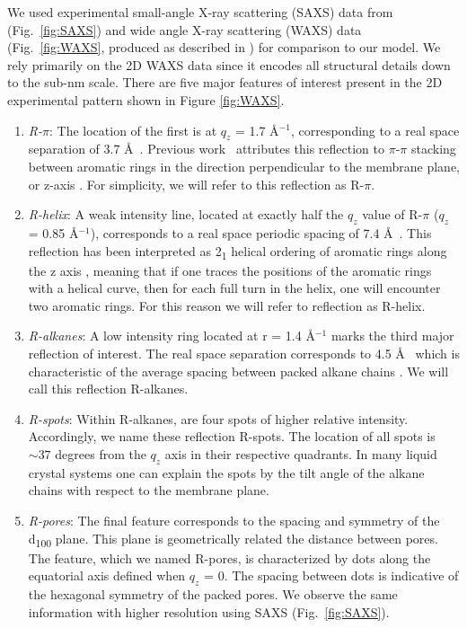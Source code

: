 \documentclass[journal=jpcbfk,manusciprt=article]{achemso}
\begin{document}
  We used experimental small-angle X-ray scattering (SAXS) data from
  \cite{feng_thin_2016} (Fig.~\ref{fig:SAXS}) and wide angle X-ray scattering
  (WAXS) data (Fig.~\ref{fig:WAXS}, produced as described in
  \cite{feng_scalable_2014}) for comparison to our model. We rely primarily on the 2D WAXS data
  since it encodes all structural details down to the sub-nm scale.  There are
  five major features of interest present in the 2D experimental pattern shown in
  Figure \ref{fig:WAXS}.

  \begin{enumerate} 
  
	\item \textit{R-$\pi$}: The location of the first is at $q_z$ = 1.7
	\AA$^{-1}$, corresponding to a real space separation of 3.7 \AA~. Previous
	work~\cite{feng_scalable_2014} attributes this reflection to $\pi$-$\pi$
	stacking between aromatic rings in the direction perpendicular to the membrane
	plane, or z-axis \cite{feng_scalable_2014}. For simplicity, we will refer to
	this reflection as R-$\pi$.
 
	\item \textit{R-helix}: A weak intensity line, located at exactly half
	the $q_z$ value of R-$\pi$ ($q_z$ = 0.85 \AA$^{-1}$), corresponds to a real
	space periodic spacing of 7.4 \AA~. This reflection has been interpreted as
	2\textsubscript{1} helical ordering of aromatic rings along the z axis
	\cite{feng_scalable_2014}, meaning that if one traces the positions of the
	aromatic rings with a helical curve, then for each full turn in the helix, one
	will encounter two aromatic rings. For this reason we will refer to reflection
	as R-helix. 

	\item \textit{R-alkanes}: A low intensity ring located at r = 1.4
	\AA$^{-1}$ marks the third major reflection of interest. The real space
	separation corresponds to 4.5 \AA~ which is characteristic of the average
	spacing between packed alkane chains \cite{mcintosh_organization_1980}. We will
	call this reflection R-alkanes.

	\item \textit{R-spots}: Within R-alkanes, are four spots of higher
	relative intensity.  Accordingly, we name these reflection R-spots. The
	location of all spots is $\sim 37$ degrees from the $q_z$ axis in their
	respective quadrants. In many liquid crystal systems one can explain the spots
	by the tilt angle of the alkane chains with respect to the membrane 
	plane\cite{govind_simple_2001}.
 
	\item \textit{R-pores}: The final feature corresponds to the spacing
	and symmetry of the d\textsubscript{100} plane. This plane is geometrically
	related the distance between pores. The feature, which we named R-pores, is
	characterized by dots along the equatorial axis defined when $q_z$ = 0. The
	spacing between dots is indicative of the hexagonal symmetry of the packed
	pores. We observe the same information with higher resolution using SAXS
	(Fig.~\ref{fig:SAXS}). 

  \end{enumerate}
\end{document}
